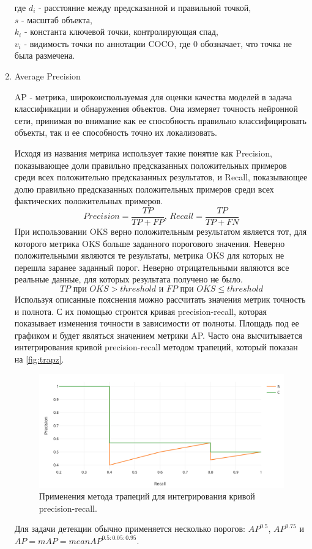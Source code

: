 \begin{enumerate}
где $d_i$ - расстояние между предсказанной и правильной точкой,\\
$s$ - масштаб объекта,\\
$k_i$ - константа ключевой точки, контролирующая спад,\\
$v_i$ - видимость точки по аннотации COCO, где 0 обозначает, что точка не была размечена.

\item Average Precision

AP - метрика, широкоиспользуемая для оценки качества моделей в задача классификации и обнаружения объектов. Она измеряет точность нейронной сети, принимая во внимание как ее способность правильно классифицировать объекты, так и ее способность точно их локализовать.

Исходя из названия метрика использует такие понятие как Precision, показывающее доли правильно предсказанных положительных примеров среди всех положительно предсказанных результатов, и Recall, показывающее долю правильно предсказанных положительных примеров среди всех фактических положительных примеров.
$$
Precision = \frac{TP}{TP + FP} \text{, } Recall = \frac{TP}{TP + FN}
$$
При использовании OKS верно положительным результатом является тот, для которого метрика OKS больше заданного порогового значения. Неверно положительными являются те результаты, метрика OKS для которых не перешла заранее заданный порог. Неверно отрицательными являются все реальные данные, для которых результата получено не было.
$$
TP\text{ при }OKS > threshold\text{ и }FP\text{ при }OKS \leq threshold
$$
Используя описанные пояснения можно рассчитать значения метрик точность и полнота. С их помощью строится кривая precision-recall, которая показывает изменения точности в зависимости от полноты. Площадь под ее графиком и будет являться значением метрики AP. Часто она высчитывается интегрирования кривой precision-recall методом трапеций, который показан на \autoref{fig:trapz}.

\begin{figure}[h]
	\centering
	\includegraphics[width=.75\textwidth]{./images/AP}
	\caption{Применения метода трапеций для интегрирования кривой precision-recall.}
	\label{fig:trapz}
\end{figure}

Для задачи детекции обычно применяется несколько порогов: $AP^{0.5}$, $AP^{0.75}$ и $AP = mAP = mean AP^{0.5:0.05:0.95}$.

\end{enumerate}

